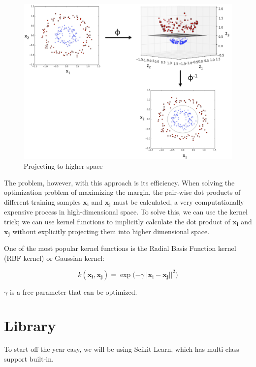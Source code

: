 \documentclass{article}
\begin{document}
\begin{figure}[h!]
\centering
\includegraphics[scale=0.18]{dimensions.jpg}
\caption{Projecting to higher space}
\label{fig:mapping}
\end{figure}
The problem, however, with this approach is its efficiency. When solving the optimization problem of maximizing the margin, the pair-wise dot products of different training samples $\bm{x_i}$ and $\bm{x_j}$ must be calculated, a very computationally expensive process in high-dimensional space. To solve this, we can use the kernel trick; we can use kernel functions to implicitly calculate the dot product of $\bm{x_i}$ and $\bm{x_j}$ without explicitly projecting them into higher dimensional space. 

One of the most popular kernel functions is the Radial Basis Function kernel (RBF kernel) or Gaussian kernel:

\[ k(\bm{x_i}, \bm{x_j}) = \exp{(-\gamma||\bm{x_i}-\bm{x_j}||^2}) \]

$\gamma$ is a free parameter that can be optimized.

\section{Library}
To start off the year easy, we will be using Scikit-Learn, which has multi-class support built-in.


\end{document}
